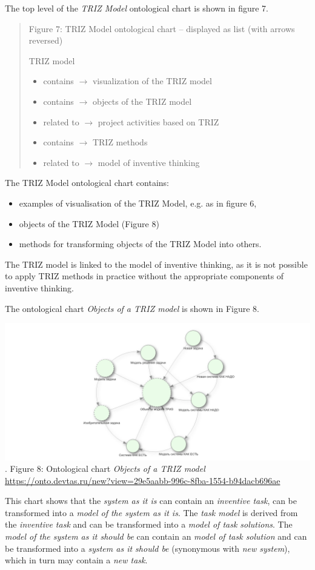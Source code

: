 \documentclass[11pt,a4paper]{article}
\begin{document}
The top level of the \emph{TRIZ Model} ontological chart is shown in figure 7.
\begin{quote}
  Figure 7: TRIZ Model ontological chart -- displayed as list (with arrows
  reversed)

  TRIZ model
  \begin{itemize}[noitemsep]
  \item contains $\to$ visualization of the TRIZ model
  \item contains $\to$ objects of the TRIZ model
  \item related to $\to$ project activities based on TRIZ
  \item contains $\to$ TRIZ methods
  \item related to $\to$ model of inventive thinking
  \end{itemize}
\end{quote}
The TRIZ Model ontological chart contains:
\begin{itemize}[noitemsep]
\item examples of visualisation of the TRIZ Model, e.g. as in figure 6,
\item objects of the TRIZ Model (Figure 8)
\item methods for transforming objects of the TRIZ Model into others.
\end{itemize}
The TRIZ model is linked to the model of inventive thinking, as it is not
possible to apply TRIZ methods in practice without the appropriate components
of inventive thinking.

The ontological chart \emph{Objects of a TRIZ model} is shown in Figure 8.

\begin{center}
  \includegraphics[width=.8\textwidth]{8.png}\\.
  Figure 8: Ontological chart \emph{Objects of a TRIZ model}
  \url{https://onto.devtas.ru/new?view=29e5aabb-996c-8fba-1554-b94dacb696ae} 
\end{center}
This chart shows that the \emph{system as it is} can contain an
\emph{inventive task}, can be transformed into a \emph{model of the system as
  it is}.  The \emph{task model} is derived from the \emph{inventive task} and
can be transformed into a \emph{model of task solutions}. The \emph{model of
  the system as it should be} can contain an \emph{model of task solution} and
can be transformed into a \emph{system as it should be} (synonymous with
\emph{new system}), which in turn may contain a \emph{new task}.
\end{document}
